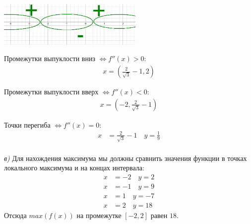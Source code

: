 \documentclass[a4paper,11pt]{article}
\begin{document}
\begin{center}
	\includegraphics[width = 70mm]{images/63.png}
\end{center}
\noindent Промежутки  выпуклости вниз $\Longleftrightarrow f''(x) > 0 $:
\begin{gather*}
x = (\frac{2}{\sqrt{3}} - 1, 2)
\end{gather*}

\noindent Промежутки  выпуклости вверх $\Longleftrightarrow f''(x) < 0 $:
\begin{gather*}
x = (-2, \frac{2}{\sqrt{3}} - 1)
\end{gather*}

\noindent Точки перегиба   $\Longleftrightarrow f''(x) = 0 $:
\begin{align*}
x &= \frac{2}{\sqrt{3}} - 1 \quad y = \frac{1}{9} \\
\end{align*}

\textsl{в)} Для нахождения максимума мы должны сравнить значения функции в точках локального максимума и на концах интервала:
\begin{align*}
x &= -2 \quad y = 2 \\
x &= -1 \quad y = 9 \\
x &= 1 \quad y = -7 \\
x &= 2 \quad y = 18
\end{align*}
Отсюда $ max(f(x))  $ на промежутке $ [-2, 2] $ равен $ 18 $.
\newpage





\end{document}
